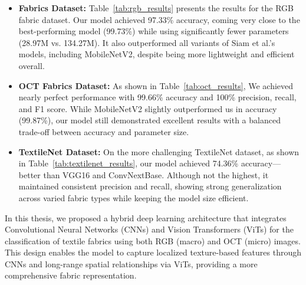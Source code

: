 \begin{itemize}[topsep=0pt, noitemsep]
    \item \textbf{Fabrics Dataset:} Table~\ref{tab:rgb_results} presents the results for the RGB fabric dataset. Our model achieved 97.33\% accuracy, coming very close to the best-performing model (99.73\%) while using significantly fewer parameters (28.97M vs. 134.27M). It also outperformed all variants of Siam et al.’s models, including MobileNetV2, despite being more lightweight and efficient overall.

    \item \textbf{OCT Fabrics Dataset:} As shown in Table~\ref{tab:oct_results}, We achieved nearly perfect performance with 99.66\% accuracy and 100\% precision, recall, and F1 score. While MobileNetV2 slightly outperformed us in accuracy (99.87\%), our model still demonstrated excellent results with a balanced trade-off between accuracy and parameter size.

    \item \textbf{TextileNet Dataset:} On the more challenging TextileNet dataset, as shown in Table~\ref{tab:textilenet_results}, our model achieved 74.36\% accuracy—better than VGG16 and ConvNextBase. Although not the highest, it maintained consistent precision and recall, showing strong generalization across varied fabric types while keeping the model size efficient.
\end{itemize}

In this thesis, we proposed a hybrid deep learning architecture that integrates Convolutional Neural Networks (CNNs) and Vision Transformers (ViTs) for the classification of textile fabrics using both RGB (macro) and OCT (micro) images. This design enables the model to capture localized texture-based features through CNNs and long-range spatial relationships via ViTs, providing a more comprehensive fabric representation.

